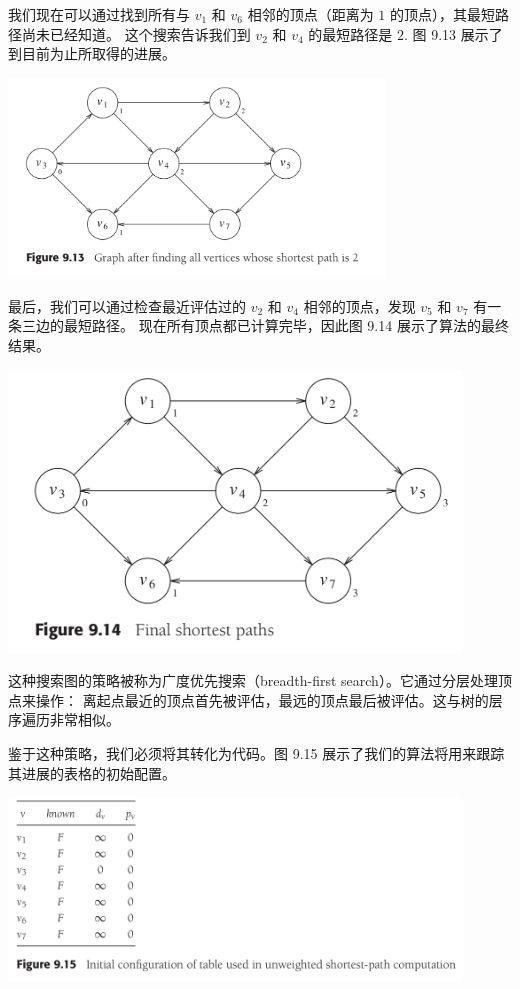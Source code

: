 \documentclass[a4paper]{ctexart}
\theoremstyle{definition}
\theoremstyle{definition}
\begin{document}
我们现在可以通过找到所有与 \(v_1\) 和 \(v_6\) 相邻的顶点（距离为 $1$ 的顶点），其最短路径尚未已经知道。
这个搜索告诉我们到 \(v_2\) 和 \(v_4\) 的最短路径是 $2$. 图 9.13 展示了到目前为止所取得的进展。

\begin{center}
  \includegraphics[width=0.75\textwidth]{images/FIG9_13.png}
\end{center}

最后，我们可以通过检查最近评估过的 \(v_2\) 和 \(v_4\) 相邻的顶点，发现 \(v_5\) 和 \(v_7\) 有一条三边的最短路径。
现在所有顶点都已计算完毕，因此图 9.14 展示了算法的最终结果。

\begin{center}
  \includegraphics[width=0.9\textwidth]{images/FIG9_14.png}
\end{center}

这种搜索图的策略被称为广度优先搜索（breadth-first search）。它通过分层处理顶点来操作：
离起点最近的顶点首先被评估，最远的顶点最后被评估。这与树的层序遍历非常相似。

鉴于这种策略，我们必须将其转化为代码。图 9.15 展示了我们的算法将用来跟踪其进展的表格的初始配置。

\begin{center}
  \includegraphics[width=0.9\textwidth]{images/FIG9_15.png}
\end{center}
\end{document}
